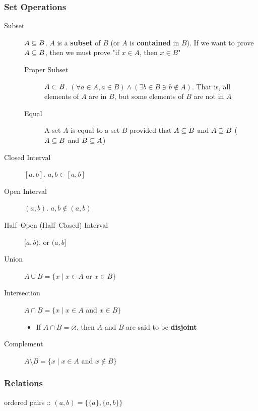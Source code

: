 \documentclass[12pt]{article}
\begin{document}
\subsubsection{Set Operations}
\label{sec:orgc78dbe0}
\begin{description}
\item[{Subset}] \(A \subseteq{} B\). \(A\) is a \textbf{subset} of \(B\) (or \(A\) is \textbf{contained} in \(B\)). If
we want to prove \(A \subseteq{} B\), then we must prove "if \(x \in{} A\), then \(x
               \in{} B\)"
\begin{description}
\item[{Proper Subset}] \(A \subset B\). \((\forall a \in{} A, a \in{} B) \land (\exists b \in{} B \ni{} b \notin A)\). That
is, all elements of \(A\) are in \(B\), but some elements of
\(B\) are not in \(A\)
\item[{Equal}] A set \(A\) is equal to a set \(B\) provided that \(A \subseteq B\) and \(A
                \supseteq B\) (\(A \subseteq B\) and \(B \subseteq A\))
\end{description}

\item[{Closed Interval}] \([a,b]\). \(a,b \in [a,b]\)

\item[{Open Interval}] \((a,b)\). \(a,b \notin (a,b)\)

\item[{Half--Open (Half--Closed) Interval}] \([a,b)\), or \((a,b]\)

\item[{Union}] \(A \cup B = \{x \mid x \in A\) or \(x \in B\}\)

\item[{Intersection}] \(A \cap B = \{x \mid x \in A\) and \(x \in B\}\)
\begin{itemize}
\item If \(A \cap B = \varnothing\), then \(A\) and \(B\) are said to be \textbf{disjoint}
\end{itemize}

\item[{Complement}] \(A \setminus B = \{x \mid x \in A\) and \(x \notin B\}\)
\end{description}

\subsubsection{Relations}
\label{sec:orgc30e475}
\begin{definition}
  ordered pairs :: $(a, b) = \{\{a\}, \{a, b\}\}$
\end{definition}
\end{document}
